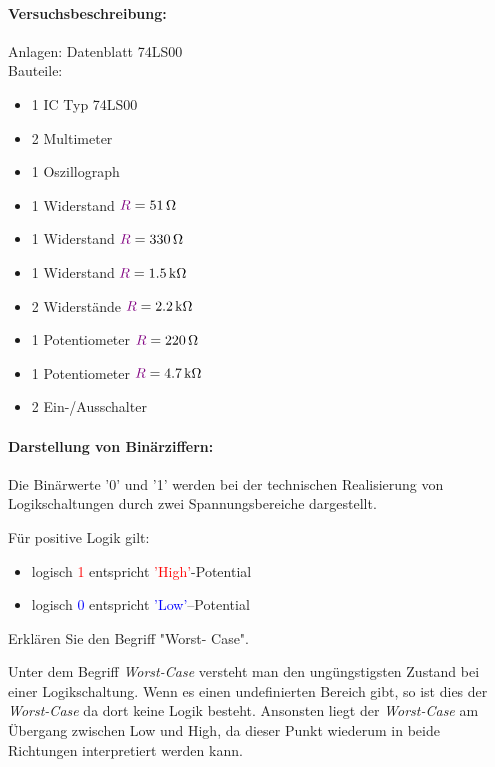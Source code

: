 \documentclass[a4paper,titlepage,parskip]{scrreprt}
\newcommand{\widerstand}[1]{\textcolor{violet}{#1}}
\begin{document}
  
  \tableofcontents


      \paragraph{Versuchsbeschreibung:}
        Anlagen: Datenblatt 74LS00\\
        Bauteile:
        \begin{itemize}
          \setlength\itemsep{-1em}
          \item 1 IC Typ 74LS00
          \item 2 Multimeter
          \item 1 Oszillograph
          \item 1 Widerstand $\widerstand{R} = \SI{51}{\ohm}$
          \item 1 Widerstand $\widerstand{R} = \SI{330}{\ohm}$
          \item 1 Widerstand $\widerstand{R} = \SI{1,5}{\kilo\ohm}$
          \item 2 Widerstände $\widerstand{R} = \SI{2,2}{\kilo\ohm}$
          \item 1 Potentiometer $\widerstand{R} = \SI{220}{\ohm}$
          \item 1 Potentiometer $\widerstand{R} = \SI{4,7}{\kilo\ohm}$
          \item 2 Ein-/Ausschalter
        \end{itemize}
    
      \paragraph{Darstellung von Binärziffern:} Die Binärwerte '0' und '1' werden bei der technischen Realisierung von Logikschaltungen durch zwei Spannungsbereiche dargestellt.
    
        Für positive Logik gilt:
        \begin{itemize}
          \setlength\itemsep{-1em}
          \item logisch \textcolor{red}{1} entspricht \textcolor{red}{'High'}-Potential
          \item logisch \textcolor{blue}{0} entspricht \textcolor{blue}{'Low'}–Potential
        \end{itemize}
    
        Erklären Sie den Begriff "Worst- Case".
    
        Unter dem Begriff \textit{Worst-Case} versteht man den ungüngstigsten Zustand bei einer Logikschaltung. Wenn es einen undefinierten Bereich gibt, so ist dies der \textit{Worst-Case} da dort keine Logik besteht. Ansonsten liegt der \textit{Worst-Case} am Übergang zwischen Low und High, da dieser Punkt wiederum in beide Richtungen interpretiert werden kann.
\end{document}

